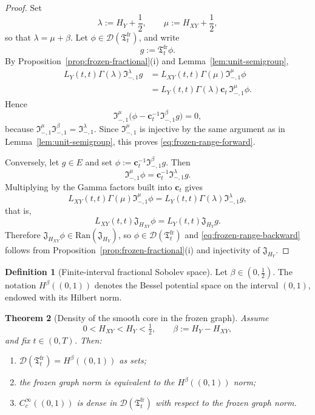 \documentclass[11pt,a4paper]{amsart}
\theoremstyle{plain}
\newtheorem{theorem}{Theorem}[section]
\theoremstyle{definition}
\newtheorem{definition}[theorem]{Definition}
\theoremstyle{remark}
\begin{document}
\begin{proof}
Set
\[
\lambda:=H_Y+\frac12,
\qquad
\mu:=H_{XY}+\frac12,
\]
so that \(\lambda=\mu+\beta\). Let \(\phi\in\mathcal D(\mathfrak T_t^{\mathrm{fr}})\), and write
\[
g:=\mathfrak T_t^{\mathrm{fr}}\phi.
\]
By Proposition~\ref{prop:frozen-fractional}(i) and Lemma~\ref{lem:unit-semigroup},
\begin{align*}
L_Y(t,t)\Gamma(\lambda)\mathfrak I_{-,1}^{\lambda}g
&=
L_{XY}(t,t)\Gamma(\mu)\mathfrak I_{-,1}^{\mu}\phi \\
&=
L_Y(t,t)\Gamma(\lambda)\mathbf c_t\,\mathfrak I_{-,1}^{\mu}\phi.
\end{align*}
Hence
\[
\mathfrak I_{-,1}^{\mu}\bigl(\phi-\mathbf c_t^{-1}\mathfrak I_{-,1}^{\beta}g\bigr)=0,
\]
because \(\mathfrak I_{-,1}^{\mu}\mathfrak I_{-,1}^{\beta}=\mathfrak I_{-,1}^{\lambda}\). Since
\(\mathfrak I_{-,1}^{\mu}\) is injective by the same argument as in
Lemma~\ref{lem:unit-semigroup}, this proves \eqref{eq:frozen-range-forward}.

Conversely, let \(g\in E\) and set \(\phi:=\mathbf c_t^{-1}\mathfrak I_{-,1}^{\beta}g\). Then
\[
\mathfrak I_{-,1}^{\mu}\phi
=
\mathbf c_t^{-1}\mathfrak I_{-,1}^{\lambda}g.
\]
Multiplying by the Gamma factors built into \(\mathbf c_t\) gives
\[
L_{XY}(t,t)\Gamma(\mu)\mathfrak I_{-,1}^{\mu}\phi
=
L_Y(t,t)\Gamma(\lambda)\mathfrak I_{-,1}^{\lambda}g,
\]
that is,
\[
L_{XY}(t,t)\mathfrak J_{H_{XY}}\phi
=
L_Y(t,t)\mathfrak J_{H_Y}g.
\]
Therefore \(\mathfrak J_{H_{XY}}\phi\in\mathrm{Ran}(\mathfrak J_{H_Y})\), so
\(\phi\in\mathcal D(\mathfrak T_t^{\mathrm{fr}})\) and
\eqref{eq:frozen-range-backward} follows from Proposition~\ref{prop:frozen-fractional}(i) and
injectivity of \(\mathfrak J_{H_Y}\).
\end{proof}

\begin{definition}[Finite-interval fractional Sobolev space]\label{def:Hbeta-interval}
Let \(\beta\in(0,\tfrac12)\).  The notation \(H^\beta((0,1))\) denotes the Bessel potential space on the
interval \((0,1)\), endowed with its Hilbert norm.
\end{definition}

\begin{theorem}[Density of the smooth core in the frozen graph]
\label{thm:frozen-density}
Assume
\[
0<H_{XY}<H_Y<\tfrac12,
\qquad
\beta:=H_Y-H_{XY},
\]
and fix \(t\in(0,T)\). Then:
\begin{enumerate}[label=(\roman*)]
\item \(\mathcal D(\mathfrak T_t^{\mathrm{fr}})=H^\beta((0,1))\) as sets;
\item the frozen graph norm is equivalent to the \(H^\beta((0,1))\) norm;
\item \(C_c^\infty((0,1))\) is dense in \(\mathcal D(\mathfrak T_t^{\mathrm{fr}})\) with respect
to the frozen graph norm.
\end{enumerate}
\end{theorem}
\end{document}

